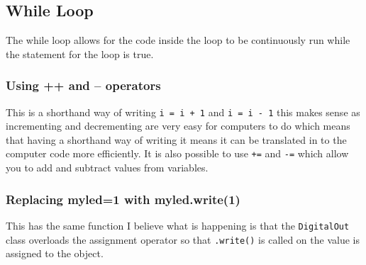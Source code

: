 \documentclass[a4paper,12pt]{scrartcl}
\begin{document}
{		\subsection{While Loop}
		{
			The while loop allows for the code inside the loop to be continuously run while the statement for the loop is true.
			\subsubsection{Using ++ and -- operators}
			{
				This is a shorthand way of writing \lstinline|i = i + 1| and \lstinline|i = i - 1| this makes sense as incrementing and decrementing are very easy for computers to do which means that having a shorthand way of writing it means it can be translated in to the computer code more efficiently. It is also possible to use \lstinline|+=| and \lstinline|-=| which allow you to add and subtract values from variables.
			}
			\subsubsection{Replacing myled=1 with myled.write(1)}
			{
				This has the same function I believe what is happening is that the \lstinline|DigitalOut| class overloads the assignment operator so that \lstinline|.write()| is called on the value is assigned to the object. 
			}
		}
}
\end{document}
